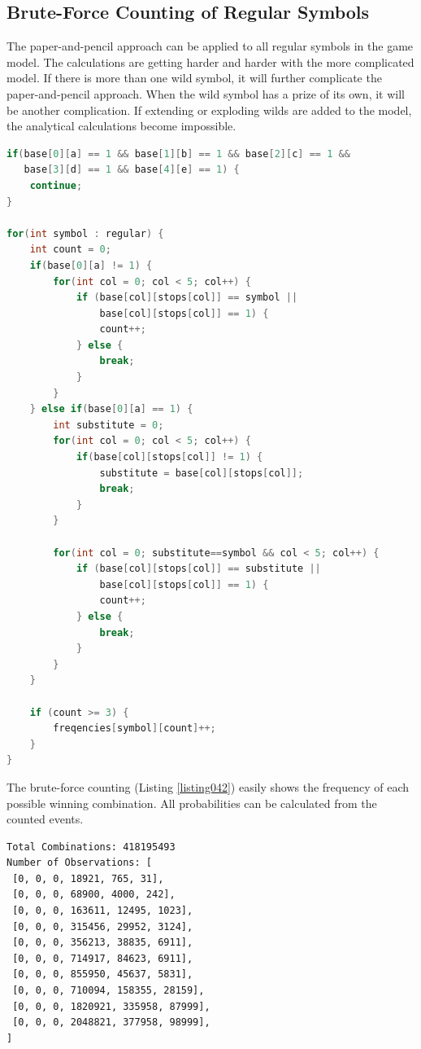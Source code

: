 \documentclass[12pt,twoside,openany]{book}
\begin{document}
\subsection*{Brute-Force Counting of Regular Symbols}

The paper-and-pencil approach can be applied to all regular symbols in the game model. The calculations are getting harder and harder with the more complicated model. If there is more than one wild symbol, it will further complicate the paper-and-pencil approach. When the wild symbol has a prize of its own, it will be another complication. If extending or exploding wilds are added to the model, the analytical calculations become impossible.

\begin{lstlisting}[language=Java, caption={Brute-force generation of all line winnings}, label=listing042]
if(base[0][a] == 1 && base[1][b] == 1 && base[2][c] == 1 && 
   base[3][d] == 1 && base[4][e] == 1) {
	continue;
}

for(int symbol : regular) {
	int count = 0;
	if(base[0][a] != 1) {
		for(int col = 0; col < 5; col++) {
			if (base[col][stops[col]] == symbol || 
			    base[col][stops[col]] == 1) {
				count++;
			} else {
				break;
			}
		}
	} else if(base[0][a] == 1) {
		int substitute = 0;
		for(int col = 0; col < 5; col++) {
			if(base[col][stops[col]] != 1) {
				substitute = base[col][stops[col]];
				break;
			}
		}

		for(int col = 0; substitute==symbol && col < 5; col++) {
			if (base[col][stops[col]] == substitute || 
			    base[col][stops[col]] == 1) {
				count++;
			} else {
				break;
			}
		}
	}

	if (count >= 3) {
		freqencies[symbol][count]++;
	}
}
\end{lstlisting}

The brute-force counting (Listing \ref{listing042}) easily shows the frequency of each possible winning combination. All probabilities can be calculated from the counted events.

\begin{lstlisting}[language=bash, caption={All possible combinations of regular symbols}, label=listing043]
Total Combinations: 418195493
Number of Observations: [
 [0, 0, 0, 18921, 765, 31],
 [0, 0, 0, 68900, 4000, 242],
 [0, 0, 0, 163611, 12495, 1023],
 [0, 0, 0, 315456, 29952, 3124],
 [0, 0, 0, 356213, 38835, 6911],
 [0, 0, 0, 714917, 84623, 6911],
 [0, 0, 0, 855950, 45637, 5831],
 [0, 0, 0, 710094, 158355, 28159],
 [0, 0, 0, 1820921, 335958, 87999],
 [0, 0, 0, 2048821, 377958, 98999],
]
\end{lstlisting}
\end{document}
